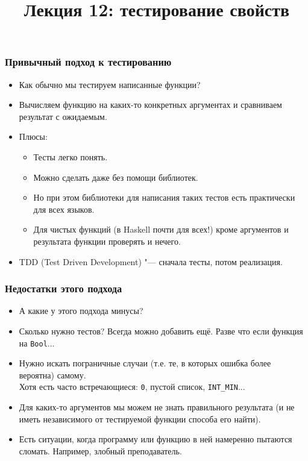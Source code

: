 \documentclass[11pt]{beamer}
\title{Лекция 12: тестирование свойств}
\begin{document}
\begin{frame}[plain]
  \maketitle
\end{frame}

\begin{frame}[fragile]
  \frametitle{Привычный подход к тестированию}
  \begin{itemize}
    \item Как обычно мы тестируем написанные функции?
          \pause
    \item Вычисляем функцию на каких-то конкретных аргументах и сравниваем результат с ожидаемым.
    \item Плюсы:
          \pause
          \begin{itemize}
            \item Тесты легко понять.
            \item Можно сделать даже без помощи библиотек.
            \item Но при этом библиотеки для написания таких тестов есть практически для всех языков.
            \item Для чистых функций (в Haskell почти для всех!) кроме аргументов и результата функции проверять и нечего.
          \end{itemize}
          \pause
    \item TDD (Test Driven Development) \pause "--- сначала тесты, потом реализация.
  \end{itemize}
\end{frame}

\begin{frame}[fragile]
  \frametitle{Недостатки этого подхода}
  \begin{itemize}
    \item А какие у этого подхода минусы?
          \pause
    \item Сколько нужно тестов? Всегда можно добавить ещё.
          \pause
          Разве что если функция на \lstinline|Bool|...
          \pause
    \item Нужно искать пограничные случаи (т.е. те, в которых ошибка более вероятна) самому. \\
          Хотя есть часто встречающиеся: \pause \lstinline|0|, пустой список, \lstinline|INT_MIN|...
          \pause
    \item Для каких-то аргументов мы можем не знать правильного результата (и не иметь независимого от тестируемой функции способа его найти).
          \pause
    \item Есть ситуации, когда программу или функцию в ней намеренно пытаются сломать. \pause Например, злобный преподаватель.
  \end{itemize}
\end{frame}
\end{document}
